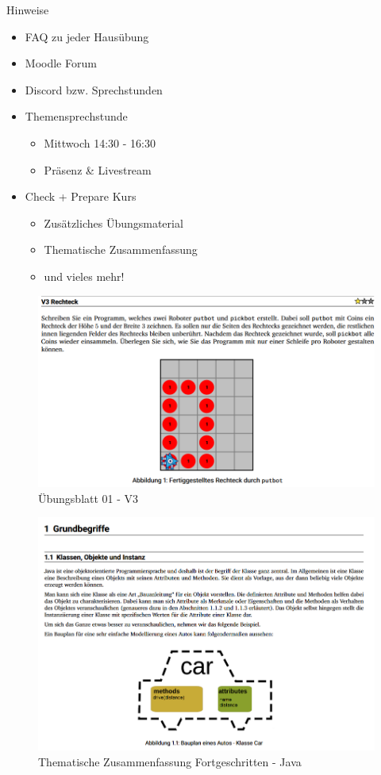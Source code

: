 \documentclass{../tuda-beamer}
\begin{document}
    \begin{frame}{Hinweise}
        \begin{itemize}
            \item FAQ zu jeder Hausübung
            \item Moodle Forum
            \item Discord bzw. Sprechstunden
            \item Themensprechstunde
            \begin{itemize}
                \item Mittwoch 14:30 - 16:30
                \item Präsenz \& Livestream
            \end{itemize}
            \item Check + Prepare Kurs
            \begin{itemize}
                \item Zusätzliches Übungsmaterial
                \item Thematische Zusammenfassung
                \item und vieles mehr!
            \end{itemize}
        \end{itemize}
    \end{frame}

    \begin{frame}[c]
        \begin{figure}[h]
            \centering
            \includegraphics[width=.7\linewidth]{graphics/cp_exercise_example.png}
            \caption{Übungsblatt 01 - V3}
        \end{figure}
    \end{frame}

    \begin{frame}[c]
        \begin{figure}[h]
            \centering
            \includegraphics[width=.6\linewidth]{graphics/cp_summary_example.png}
            \caption{Thematische Zusammenfassung Fortgeschritten - Java}
        \end{figure}
    \end{frame}
\end{document}
